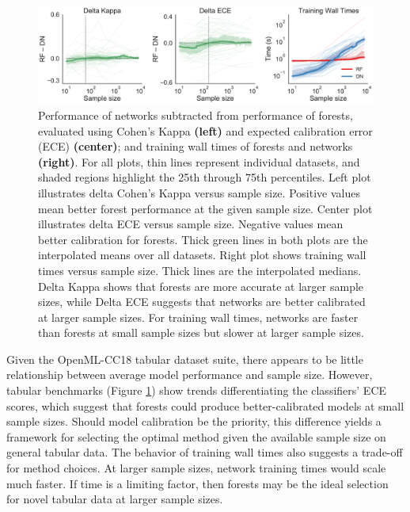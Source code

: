 \begin{figure}[htb]
\centering
\includegraphics[width=1.0\textwidth]{figures/cc18}
  \caption{Performance of networks subtracted from performance of forests, evaluated using Cohen's Kappa \textbf{(left)} and expected calibration error (ECE) \textbf{(center)}; and training wall times of forests and networks \textbf{(right)}. 
  For all plots, thin lines represent individual datasets, and shaded regions highlight the 25th through 75th percentiles. Left plot illustrates delta Cohen's Kappa versus sample size. Positive values mean better forest performance at the given sample size. Center plot illustrates delta ECE versus sample size. Negative values mean better calibration for forests. Thick green lines in both plots are the interpolated means over all datasets. Right plot shows training wall times versus sample size. Thick lines are the interpolated medians. 
  Delta Kappa shows that forests are more accurate at larger sample sizes, while Delta ECE suggests that networks are better calibrated at larger sample sizes. For training wall times, networks are faster than forests at small sample sizes but slower at larger sample sizes.
  }
\label{fig:tab}
\end{figure}

Given the OpenML-CC18 tabular dataset suite, there appears to be little relationship between average model performance and sample size. However, tabular benchmarks (Figure \ref{fig:tab}) show trends differentiating the classifiers' ECE scores, which suggest that forests could produce better-calibrated models at small sample sizes. Should model calibration be the priority, this difference yields a framework for selecting the optimal method given the available sample size on general tabular data. The behavior of training wall times also suggests a trade-off for method choices. At larger sample sizes, network training times would scale much faster. If time is a limiting factor, then forests may be the ideal selection for novel tabular data at larger sample sizes.


